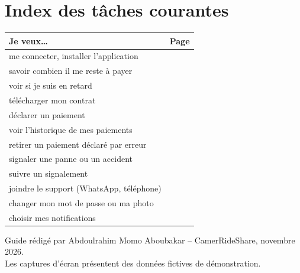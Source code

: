 \documentclass[11pt,a4paper]{article}
\let\oldsection\section
\renewcommand{\section}{\clearpage\oldsection}
\begin{document}
\section{Index des tâches courantes}\label{sec:taches}

\begin{center}
\begin{tabularx}{\linewidth}{@{}Xr@{}}
\toprule
\textbf{Je veux\ldots} & \textbf{Page}\\
\midrule
me connecter, installer l'application & \pageref{fig:connexion}\\
savoir combien il me reste à payer & \pageref{fig:dashboard}\\
voir si je suis en retard & \pageref{fig:statutretard}\\
télécharger mon contrat & \pageref{fig:contrat}\\
déclarer un paiement & \pageref{fig:declarer}\\
voir l'historique de mes paiements & \pageref{fig:paiements}\\
retirer un paiement déclaré par erreur & \pageref{fig:retirer}\\
signaler une panne ou un accident & \pageref{fig:signalement}\\
suivre un signalement & \pageref{fig:signalements}\\
joindre le support (WhatsApp, téléphone) & \pageref{fig:support}\\
changer mon mot de passe ou ma photo & \pageref{fig:profil}\\
choisir mes notifications & \pageref{fig:notifs}\\
\bottomrule
\end{tabularx}
\end{center}

\vfill
\begin{center}\small\color{gris}
Guide rédigé par Abdoulrahim Momo Aboubakar -- CamerRideShare, novembre 2026.\\
Les captures d'écran présentent des données fictives de démonstration.
\end{center}
\end{document}
